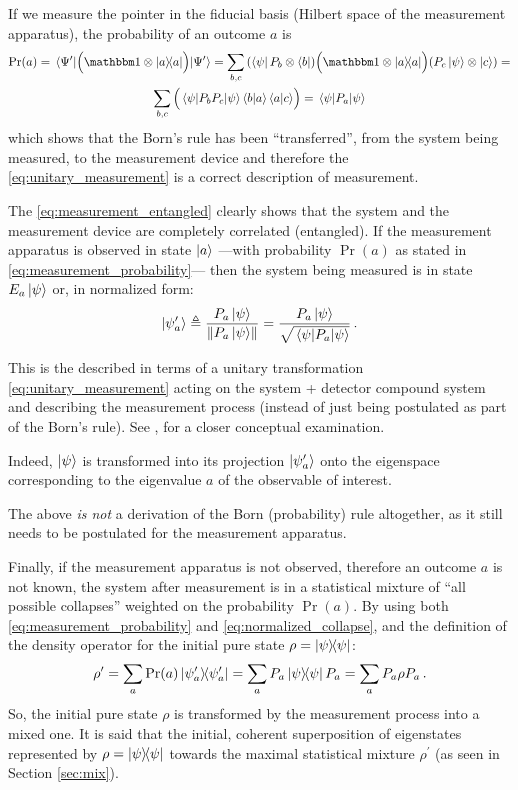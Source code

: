 If we measure the pointer in the fiducial basis
(Hilbert space of the measurement apparatus),
the probability of an outcome $a$ is
\begin{multline}\label{eq:measurement_probability}
  \Pr(a) = \expval{\qty\Big(\idop\ox\ketbra{a})}{\Psi^{\prime}} =
    \sum_{b,c}
      \qty(\bra{\psi}P_{b}\ox\bra{b})
      \qty\Big(\idop\ox\ketbra{a})
      \qty(P_{c}\ket{\psi}\ox\ket{c}) = \\
    \sum_{b,c}\qty\Big(\expval{P_bP_c}{\psi} \braket{b}{a} \braket{a}{c}) =
    \expval{P_a}{\psi}
\end{multline}
which shows that the Born's rule has been ``transferred'', from the system being
measured, to the measurement device and therefore the
\eqref{eq:unitary_measurement} is a correct description of measurement.

The \eqref{eq:measurement_entangled} clearly shows that the system
and the measurement device are completely correlated (entangled).
If the measurement apparatus is observed in state $\ket{a}$
---with probability $\Pr(a)$ as stated in \eqref{eq:measurement_probability}---
then the system being measured is in state $E_{a}\ket{\psi}$
or, in normalized form:
\begin{equation}\label{eq:normalized_collapse}
  \ket{\psi^\prime_a} \triangleq \frac{P_{a}\ket{\psi}}{\norm{P_{a}\ket{\psi}}}
    = \frac{P_{a}\ket{\psi}}{\sqrt{\expval{P_a}{\psi}}} \,\text{.}
\end{equation}

This is the  described in terms of a unitary
transformation \eqref{eq:unitary_measurement}
acting on the system + detector compound system and describing
the measurement process
(instead of just being postulated as part of the Born's rule).
See \cite[sec.2.5.4, \emph{Decoherence models versus Copenhagen interpretation}]{Haroche_Exploring},
for a closer conceptual examination.

Indeed,
$\ket{\psi}$
is transformed
into its projection $\ket{\psi^\prime_a}$
onto the eigenspace
corresponding to the eigenvalue $a$ of the observable of interest.

The above \emph{is not} a derivation of the Born (probability) rule altogether,
as it still needs to be postulated for the measurement apparatus.

Finally, if the measurement apparatus is not observed,
therefore an outcome $a$ is not known,
the system after measurement is in a statistical mixture
of ``all possible collapses'' weighted on the probability $\Pr(a)$.
By using both \eqref{eq:measurement_probability} and \eqref{eq:normalized_collapse},
and the definition of the density operator for the initial pure state
$\rho = \ketbra{\psi}$:
\[
  \rho^{\prime} = \sum_a \Pr(a) \ketbra{\psi^{\prime}_a} = \sum_a P_a \ketbra{\psi} P_a
    = \sum_a P_a \rho P_a \,\text{.}
\]
So, the initial pure state $\rho$ is transformed by the measurement process into a mixed one.
It is said that the initial, coherent superposition of eigenstates represented by $\rho = \ketbra{\psi}$
 towards the maximal statistical mixture $\rho^{\prime}$
(as seen in Section \ref{sec:mix}).

